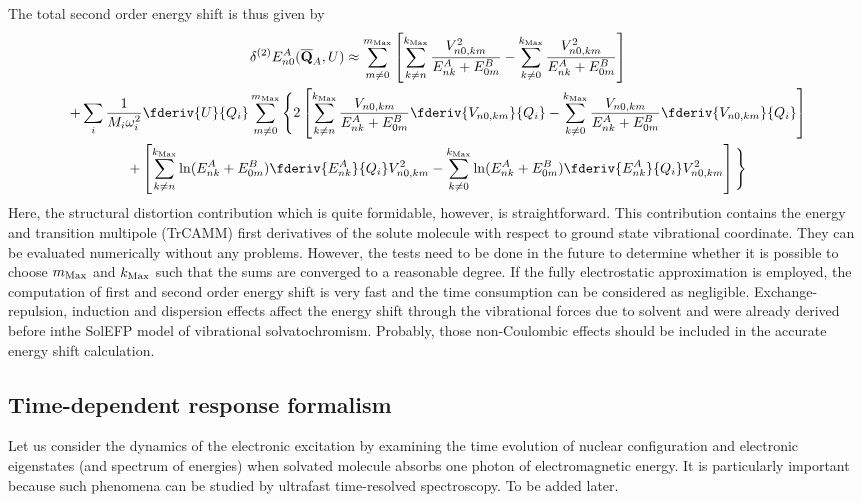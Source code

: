 The total second order energy shift is thus given by
%
\begin{multline}
\delta^{(2)} E^A_{n0}({\bf \overline{Q}}_A, U) \approx 
\sum_{m\ne 0} ^{m_{\rm Max}}
\left[
\sum_{k\ne n} ^{k_{\rm Max}} \frac{ V_{n0,km}^2 }{E^A_{nk} + E^B_{0m}}
%
- \sum_{k\ne 0} ^{k_{\rm Max}} \frac{
V_{n0,km}^2
}{E^A_{nk} + E^B_{0m}}
\right] \\
+
\sum_i \frac{1}{M_i\omega_i^2} \fderiv{U}{Q_i}
\sum_{m\ne 0} ^{m_{\rm Max}}
\Bigg\{
  2 \left[ 
\sum_{k\ne n} ^{k_{\rm Max}} \frac{ V_{n0,km} }{E^A_{nk} + E^B_{0m}} \fderiv{V_{n0,km} }{Q_i}
-
\sum_{k\ne 0} ^{k_{\rm Max}} \frac{ V_{n0,km} }{E^A_{nk} + E^B_{0m}} \fderiv{V_{n0,km} }{Q_i}
\right] \\
+
\left[
\sum_{k\ne n} ^{k_{\rm Max}} \ln (E^A_{nk} + E^B_{0m}) \fderiv{E^A_{nk}}{Q_i} V_{n0,km}^2
-
\sum_{k\ne 0} ^{k_{\rm Max}}  \ln (E^A_{nk} + E^B_{0m}) \fderiv{E^A_{nk}}{Q_i} V_{n0,km}^2
\right]
\Bigg\}
\end{multline}
%
Here, the structural distortion contribution
which is quite formidable, however, is straightforward. 
This contribution contains the energy and 
transition multipole (TrCAMM) first derivatives of the solute molecule with respect to
ground state vibrational coordinate. They can be evaluated
numerically without any problems. However, the tests need to be done in the future
to determine whether it is possible to choose ${m_{\rm Max}}$ and ${k_{\rm Max}}$
such that the sums are converged to a reasonable degree. 
If the fully electrostatic approximation is employed, 
the computation of first and second order energy shift 
is very fast and the time consumption can be considered as negligible.
Exchange\hyp{}repulsion, induction and dispersion effects
affect the energy shift through the vibrational forces
due to solvent and were already derived before
inthe SolEFP model of vibrational solvatochromism. 
Probably, those non\hyp{}Coulombic effects should be included
in the accurate energy shift calculation.



\subsection{Time-dependent response formalism}

Let us consider the dynamics of the electronic excitation 
by examining the time evolution of nuclear configuration and
electronic eigenstates (and spectrum of energies) when solvated molecule absorbs one photon
of electromagnetic energy. It is particularly important because
such phenomena can be studied by ultrafast time-resolved spectroscopy.
To be added later.


